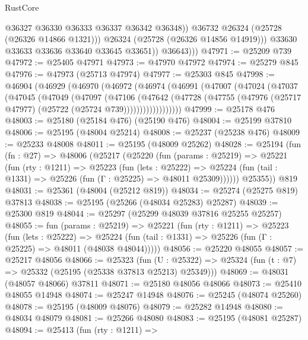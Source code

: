 \begin{lexlean}{RustCore}
\begin{coremodule}
                      @36327
                      @36330
                      @36333
                      @36337
                      @36342
                      @36348))
                  @36732
                  @26324
                  (@25728 (@26326 @14866 @1321)))
                @26324
                (@25728 (@26326 @14856 @14919)))
              @33630
              @33633
              @33636
              @33640
              @33645
              @33651))
          @36643)))
@47971 := @25209 @739
@47972 := @25405 @47971
@47973 := @47970 @47972
@47974 := @25279 @845
@47976 := @47973 (@25713 @47974)
@47977 := @25303 @845
@47998 := @46904
    (@46929
      (@46970
        (@46972
          (@46974
            (@46991
              (@47007
                (@47024
                  (@47037
                    (@47045
                      (@47049
                        (@47097
                          (@47106
                            (@47642
                              (@47728
                                (@47755
                                  (@47976 (@25717 @47977) (@25722 (@25724 @739))))))))))))))))))
@47999 := @25178 @476
@48003 := @25180 (@25184 @476) (@25190 @476)
@48004 := @25199 @37810
@48006 := @25195 (@48004 @25214)
@48008 := @25237 (@25238 @476)
@48009 := @25233 @48008
@48011 := @25195 (@48009 @25262)
@48028 := @25194
    (fun (fn : @27) =>
    @48006
      (@25217
        (@25220
          (fun (params : @25219) =>
          @25221
            (fun (rty : @1211) =>
            @25223
              (fun (lets : @25222) =>
              @25224 (fun (tail : @1331) => @25226 (fun (Γ : @25225) => @48011 @25309))))))
        @25355))
    @819
@48031 := @25361 (@48004 (@25212 @819))
@48034 := @25274 (@25275 @819) @37813
@48038 := @25195 (@25266 (@48034 @25283) @25287)
@48039 := @25300 @819
@48044 := @25297 (@25299 @48039 @37816 @25255 @25257)
@48055 := fun (params : @25219) =>
  @25221
    (fun (rty : @1211) =>
    @25223
      (fun (lets : @25222) =>
      @25224 (fun (tail : @1331) => @25226 (fun (Γ : @25225) => @48011 (@48038 @48044)))))
@48056 := @25220 @48055
@48057 := @25217 @48056
@48066 := @25323
    (fun (U : @25322) => @25324 (fun (t : @7) => @25332 (@25195 (@25338 @37813 @25213) @25349)))
@48069 := @48031 (@48057 @48066) @37811
@48071 := @25180 @48056 @48066
@48073 := @25410 @48055 @14948
@48074 := @25247 @14948
@48076 := @25245 (@48074 @25260)
@48078 := @25195 (@48009 @48076)
@48079 := @25282 @14948
@48080 := @48034 @48079
@48081 := @25266 @48080
@48083 := @25195 (@48081 @25287)
@48094 := @25413
    (fun (rty : @1211) =>

\end{coremodule}
\end{lexlean}
